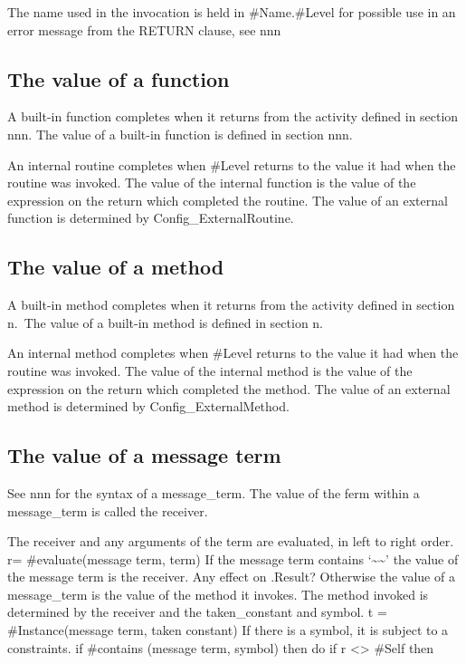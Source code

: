 The name used in the invocation is held in \#Name.\#Level for possible
use in an error message from the RETURN clause, see nnn

\subsection{The value of a function}\label{the-value-of-a-function}

A built-in function completes when it returns from the activity defined
in section nnn. The value of a built-in function is defined in section
nnn.

An internal routine completes when \#Level returns to the value it had
when the routine was invoked. The value of the internal function is the
value of the expression on the return which completed the routine. The
value of an external function is determined by Config\_ExternalRoutine.

\subsection{The value of a method}\label{the-value-of-a-method}

A built-in method completes when it returns from the activity defined in
section n.~The value of a built-in method is defined in section n.

An internal method completes when \#Level returns to the value it had
when the routine was invoked. The value of the internal method is the
value of the expression on the return which completed the method. The
value of an external method is determined by Config\_ExternalMethod.

\subsection{The value of a message
term}\label{the-value-of-a-message-term}

See nnn for the syntax of a message\_term. The value of the ferm within
a message\_term is called the receiver.

The receiver and any arguments of the term are evaluated, in left to
right order. r= \#evaluate(message term, term) If the message term
contains `\textasciitilde\textasciitilde{}' the value of the message
term is the receiver. Any effect on .Result? Otherwise the value of a
message\_term is the value of the method it invokes. The method invoked
is determined by the receiver and the taken\_constant and symbol. t =
\#Instance(message term, taken constant) If there is a symbol, it is
subject to a constraints. if \#contains (message term, symbol) then do
if r \textless\textgreater{} \#Self then

